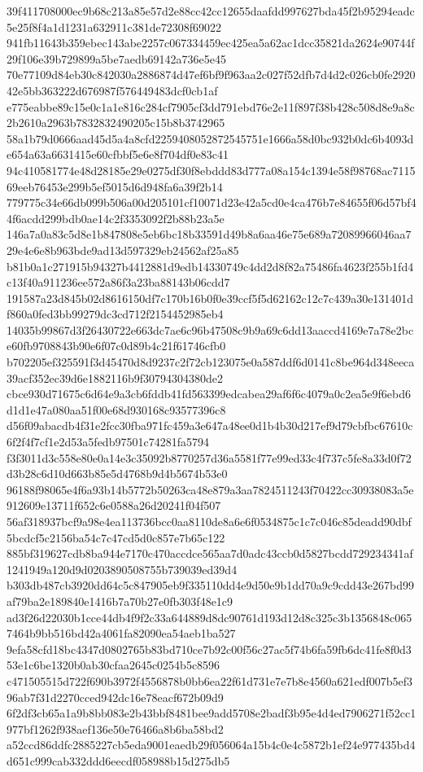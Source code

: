 \documentclass[11pt,a4paper]{article}
\begin{document}
{39f411708000ec9b68c213a85e57d2e88cc42cc12655daafdd997627bda45f2b95294eadc5e25f8f4a1d1231a632911c381de72308f69022
941fb11643b359ebec143abe2257c067334459ec425ea5a62ac1dcc35821da2624e90744f29f106e39b729899a5be7aedb69142a736e5e45
70e77109d84eb30c842030a2886874d47ef6bf9f963aa2c027f52dfb7d4d2c026cb0fe292042e5bb363222d676987f576449483dcf0cb1af
e775eabbe89c15e0c1a1e816c284cf7905cf3dd791ebd76e2e11f897f38b428c508d8e9a8c2b2610a2963b7832832490205c15b8b3742965
58a1b79d0666aad45d5a4a8cfd2259408052872545751e1666a58d0bc932b0dc6b4093de654a63a6631415e60cfbbf5e6e8f704df0e83c41
94c410581774e48d28185e29e0275df30f8ebddd83d777a08a154c1394e58f98768ac711569eeb76453e299b5ef5015d6d948fa6a39f2b14
779775c34e66db099b506a00d205101cf10071d23e42a5cd0e4ca476b7e84655f06d57bf44f6acdd299bdb0ae14c2f3353092f2b88b23a5e
146a7a0a83c5d8e1b847808e5eb6bc18b33591d49b8a6aa46e75e689a72089966046aa729e4e6e8b963bde9ad13d597329eb24562af25a85
b81b0a1c271915b94327b4412881d9edb14330749c4dd2d8f82a75486fa4623f255b1fd4c13f40a911236ee572a86f3a23ba88143b06cdd7
191587a23d845b02d8616150df7c170b16b0f0e39ccf5f5d62162c12c7c439a30e131401df860a0fed3bb99279dc3cd712f2154452985eb4
14035b99867d3f26430722e663dc7ae6c96b47508c9b9a69c6dd13aaccd4169e7a78e2bce60fb9708843b90e6f07c0d89b4c21f61746cfb0
b702205ef325591f3d45470d8d9237c2f72cb123075e0a587ddf6d0141c8be964d348eeca39acf352ec39d6e1882116b9f30794304380de2
cbce930d71675c6d64e9a3cb6fddb41fd563399edcabea29af6f6c4079a0c2ea5e9f6ebd6d1d1e47a080aa51f00e68d930168c93577396c8
d56f09abacdb4f31e2fcc30fba971fc459a3e647a48ee0d1b4b30d217ef9d79cbfbc67610c6f2f4f7cf1e2d53a5fedb97501c74281fa5794
f3f3011d3c558e80e0a14e3c35092b8770257d36a5581f77e99ed33c4f737c5fe8a33d0f72d3b28c6d10d663b85e5d4768b9d4b5674b53e0
96188f98065e4f6a93b14b5772b50263ca48e879a3aa7824511243f70422cc30938083a5e912609e13711f652c6e0588a26d20241f04f507
56af318937bcf9a98e4ea113736bcc0aa8110de8a6e6f0534875c1c7c046c85deadd90dbf5bcdcf5c2156ba54c7c47cd5d0c857e7b65c122
885bf319627cdb8ba944e7170c470accdce565aa7d0adc43ccb0d5827bcdd729234341af1241949a120d9d0203890508755b739039ed39d4
b303db487cb3920dd64c5c847905eb9f335110dd4e9d50e9b1dd70a9c9cdd43e267bd99af79ba2e189840e1416b7a70b27e0fb303f48e1c9
ad3f26d22030b1cce44db4f9f2c33a644889d8dc90761d193d12d8c325c3b1356848c0657464b9bb516bd42a4061fa82090ea54aeb1ba527
9efa58cfd18bc4347d0802765b83bd710ce7b92c00f56c27ac5f74b6fa59fb6dc41fe8f0d353e1c6be1320b0ab30cfaa2645c0254b5c8596
c471505515d722f690b3972f4556878b0bb6ea22f61d731e7e7b8e4560a621edf007b5ef396ab7f31d2270cced942dc16e78eacf672b09d9
6f2df3cb65a1a9b8bb083e2b43bbf8481bee9add5708e2badf3b95e4d4ed7906271f52cc1977bf1262f938aef136e50e76466a8b6ba58bd2
a52ccd86ddfc2885227cb5eda9001eaedb29f056064a15b4c0e4c5872b1ef24e977435bd4d651c999cab332ddd6eecdf058988b15d275db5
}
\end{document}
